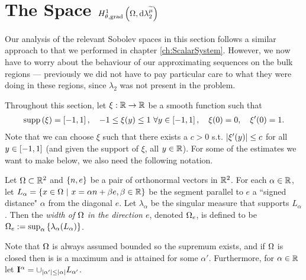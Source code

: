 \section{The Space $H^1_{\theta, \mathrm{grad}}\left( \Omega, \mathrm{d}\lambda_2^{\widetilde{\mu}} \right)$} \label{sec:CompSobSpaces}
Our analysis of the relevant Sobolev spaces in this section follows a similar approach to that we performed in chapter \ref{ch:ScalarSystem}.
However, we now have to worry about the behaviour of our approximating sequences on the bulk regions --- previously we did not have to pay particular care to what they were doing in these regions, since $\lambda_2$ was not present in the problem.

Throughout this section, let $\xi:\mathbb{R}\rightarrow\mathbb{R}$ be a smooth function such that
\begin{align*}
	\mathrm{supp}\left( \xi \right) = \left[ -1,1 \right], \quad -1\leq\xi(y)\leq1 \ \forall y\in\left[ -1,1 \right], \quad \xi(0)=0, \quad \xi'(0)=1.
\end{align*}
Note that we can choose $\xi$ such that there exists a $c>0$ s.t. $\left\lvert \xi'(y) \right\rvert\leq c$ for all $y\in\left[ -1,1 \right]$ (and given the support of $\xi$, all $y\in\mathbb{R}$).
For some of the estimates we want to make below, we also need the following notation.
\begin{definition}
	Let $\Omega\subset\mathbb{R}^2$ and $\left\{ n, e \right\}$ be a pair of orthonormal vectors in $\mathbb{R}^2$.
	For each $\alpha\in\mathbb{R}$, let $L_{\alpha} = \left\{ x\in\Omega \ \middle\vert \  x = \alpha n + \beta e, \beta\in\mathbb{R} \right\}$ be the segment parallel to $e$ a ``signed distance" $\alpha$ from the diagonal $e$.
	Let $\lambda_{\alpha}$ be the singular measure that supports $L_{\alpha}$.
	Then the \emph{width of $\Omega$ in the direction $e$}, denoted $\Omega_e$, is defined to be $\Omega_e := \sup_{\alpha}\left\{ \lambda_{\alpha}(L_{\alpha}) \right\}$.
\end{definition}
Note that $\Omega$ is always assumed bounded so the supremum exists, and if $\Omega$ is closed then is is a maximum and is attained for some $\alpha'$.
Furthermore, for $\alpha\in\mathbb{R}$ let $\mathbf{I}^{\alpha} = \cup_{\left\lvert \alpha' \right\rvert\leq\left\lvert \alpha \right\rvert}L_{\alpha'}$.

